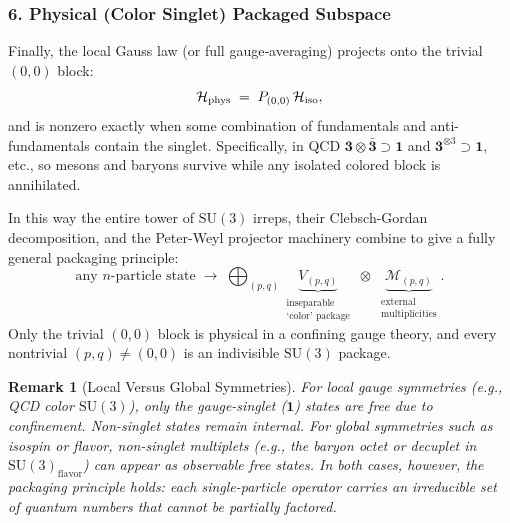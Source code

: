 \documentclass[12pt,a4paper]{article}
\newtheorem{remark}{Remark}
\begin{document}
\subsubsection*{6. Physical (Color Singlet) Packaged Subspace}

Finally, the local Gauss law (or full gauge‐averaging) projects onto the trivial $(0,0)$ block:
\[
\mathcal H_{\rm phys}
\;=\;
P_{(0,0)}\,\mathcal H_{\rm iso},
\]
and is nonzero exactly when some combination of fundamentals and anti-fundamentals contain the singlet.
Specifically, in QCD $\mathbf3\otimes\bar{\mathbf3}\supset\mathbf1$ and $\mathbf3^{\otimes3}\supset\mathbf1$, etc., so mesons and baryons survive while any isolated colored block is annihilated.

\bigskip
\noindent
In this way the entire tower of $\mathrm{SU}(3)$ irreps, their Clebsch-Gordan decomposition, and the Peter-Weyl projector machinery combine to give a fully general packaging principle:
\[
\text{any }n\text{-particle state}
\;\longrightarrow\;
\bigoplus_{(p,q)}
\underbrace{V_{(p,q)}}_{\substack{\text{inseparable}\\\text{`color' package}}}
\;\otimes\;
\underbrace{\mathcal M_{(p,q)}}_{\substack{\text{external}\\\text{multiplicities}}}.
\]
Only the trivial $(0,0)$ block is physical in a confining gauge theory, and every nontrivial $(p,q)\neq(0,0)$ is an indivisible $\mathrm{SU}(3)$ package.


\begin{remark}[Local Versus Global Symmetries]
	For local gauge symmetries (e.g., QCD color $\mathrm{SU}(3)$), only the gauge-singlet ($\mathbf{1}$) states are free due to confinement.
	Non-singlet states remain internal.
	For global symmetries such as isospin or flavor, non-singlet multiplets (e.g., the baryon octet or decuplet in $\mathrm{SU}(3)_{\text{flavor}}$) can appear as observable free states.
	In both cases, however, the packaging principle holds:
	each single-particle operator carries an irreducible set of quantum numbers that cannot be partially factored.
\end{remark}
\end{document}
